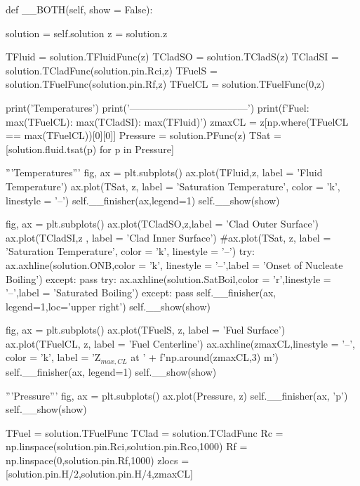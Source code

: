 \documentclass{article}
\begin{document}
\begin{python}
    def __BOTH(self, show = False):

        solution = self.solution
        z = solution.z

        TFluid = solution.TFluidFunc(z)
        TCladSO = solution.TCladS(z)
        TCladSI = solution.TCladFunc(solution.pin.Rci,z)
        TFuelS = solution.TFuelFunc(solution.pin.Rf,z)
        TFuelCL = solution.TFuelFunc(0,z)

        print('\tMaximum Temperatures')
        print('------------------------------------')
        print(f'Fuel: {max(TFuelCL)}\nClad: {max(TCladSI)}\nFluid: {max(TFluid)}')
        zmaxCL = z[np.where(TFuelCL == max(TFuelCL))[0][0]]
        Pressure = solution.PFunc(z)
        TSat = [solution.fluid.tsat(p) for p in Pressure]

        '''Temperatures'''
        fig, ax = plt.subplots()
        ax.plot(TFluid,z, label = 'Fluid Temperature')
        ax.plot(TSat, z, label = 'Saturation Temperature', color = 'k', linestyle = '--')
        self.__finisher(ax,legend=1)
        self.__show(show)

        fig, ax = plt.subplots()
        ax.plot(TCladSO,z,label = 'Clad Outer Surface')
        ax.plot(TCladSI,z , label = 'Clad Inner Surface')
        #ax.plot(TSat, z, label = 'Saturation Temperature', color = 'k', linestyle = '--')
        try:
            ax.axhline(solution.ONB,color = 'k', linestyle = '--',label = 'Onset of Nucleate Boiling')
        except: 
            pass
        try:
            ax.axhline(solution.SatBoil,color = 'r',linestyle = '--',label = 'Saturated Boiling')
        except:
            pass
        self.__finisher(ax, legend=1,loc='upper right')
        self.__show(show)

        fig, ax = plt.subplots()
        ax.plot(TFuelS, z, label = 'Fuel Surface')
        ax.plot(TFuelCL, z, label = 'Fuel Centerline')
        ax.axhline(zmaxCL,linestyle = '--', color = 'k', label = 'Z$_{max,CL}$ at ' + f'{np.around(zmaxCL,3)} m')
        self.__finisher(ax, legend=1)
        self.__show(show)

        '''Pressure'''
        fig, ax = plt.subplots()
        ax.plot(Pressure, z)
        self.__finisher(ax, 'p')
        self.__show(show)

        TFuel = solution.TFuelFunc
        TClad = solution.TCladFunc
        Rc = np.linspace(solution.pin.Rci,solution.pin.Rco,1000)
        Rf = np.linspace(0,solution.pin.Rf,1000)
        zlocs = [solution.pin.H/2,solution.pin.H/4,zmaxCL]


\end{python}
\end{document}
